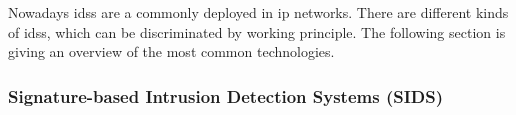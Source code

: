 Nowadays \glspl{ids} are a commonly deployed in \gls{ip} networks. There are different kinds of \glspl{ids}, which can be discriminated by working principle. The following section is giving an overview of the most common technologies. \parencite[cf.][pp.~201-202]{Northcutt2005}

\subsubsection{Signature-based Intrusion Detection Systems (SIDS)}
\label{sec:background:network:ids:sig}

